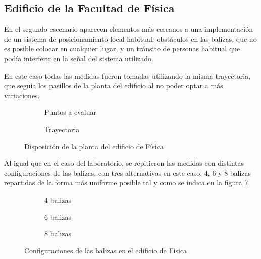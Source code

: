 \subsection{Edificio de la Facultad de Física}

En el segundo escenario aparecen elementos más cercanos a una implementación de un sistema de posicionamiento local habitual: obstáculos en las balizas, que no es posible colocar en cualquier lugar, y un tránsito de personas habitual que podía interferir en la señal del sistema utilizado.

En este caso todas las medidas fueron tomadas utilizando la misma trayectoria, que seguía los pasillos de la planta del edificio al no poder optar a más variaciones.

\begin{figure}[H]
  \begin{subfigure}[b]{.5\textwidth}
    \centering
    \def\svgwidth{0.75\linewidth}
     
    \caption{Puntos a evaluar}
    \label{fig:puntos_fisica}
  \end{subfigure}
  \begin{subfigure}[b]{.5\textwidth}
    \centering
    \def\svgwidth{0.75\linewidth}
     
    \caption{Trayectoria}
    \label{fig:trayecto_fisica}
  \end{subfigure}
  \caption{Disposición de la planta del edificio de Física}
  \label{fig:fisica}
\end{figure}

Al igual que en el caso del laboratorio, se repitieron las medidas con distintas configuraciones de las balizas, con tres alternativas en este caso: 4, 6 y 8 balizas repartidas de la forma más uniforme posible tal y como se indica en la figura \ref{fig:sensores_fisica}.

\begin{figure}[H]
  \begin{subfigure}[b]{.3\textwidth}
    \centering
    \def\svgwidth{0.9\linewidth}
     
    \caption{4 balizas}
    \label{fig:sensores_fisica_4}
  \end{subfigure}
  \begin{subfigure}[b]{.3\textwidth}
    \centering
    \def\svgwidth{0.9\linewidth}
      
    \caption{6 balizas}
    \label{fig:sensores_fisica_6}
  \end{subfigure}
  \begin{subfigure}[b]{.3\textwidth}
    \centering
    \def\svgwidth{0.9\linewidth}
      
    \caption{8 balizas}
    \label{fig:sensores_fisica_8}
  \end{subfigure}
  \caption{Configuraciones de las balizas en el edificio de Física}
  \label{fig:sensores_fisica}
\end{figure}

